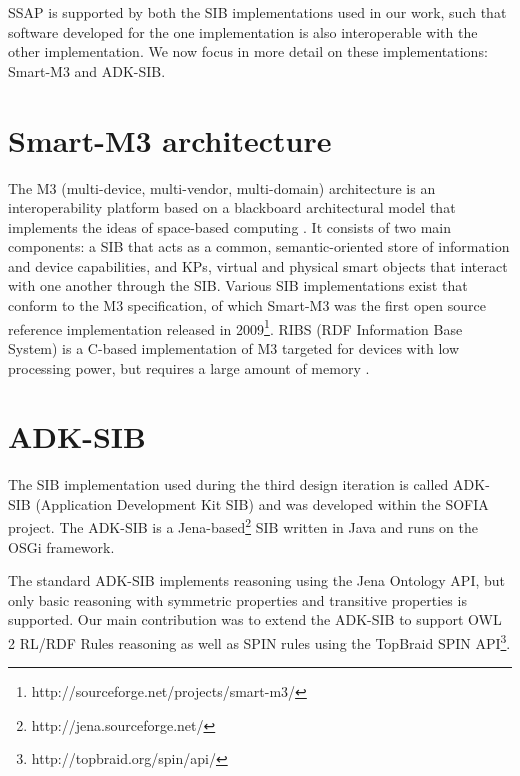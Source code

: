 \ac{SSAP} is supported by both the \ac{SIB} implementations used in our work, such that software developed for the one implementation is also interoperable with the other implementation. We now focus in more detail on these implementations: Smart-M3 and ADK-SIB.


\section{Smart-M3 architecture}
\label{m3}
The M3 (multi-device, multi-vendor, multi-domain) architecture is an interoperability platform based on a blackboard architectural model that implements the ideas of space-based computing \cite{Honkola2010}. It consists of two main components: a \ac{SIB} that acts as a common, semantic-oriented store of information and device capabilities, and \acp{KP}, virtual and physical smart objects that interact with one another through the \ac{SIB}. Various \ac{SIB} implementations exist that conform to the M3 specification, of which Smart-M3 was the first open source reference implementation released in 2009\footnote{http://sourceforge.net/projects/smart-m3/}. RIBS (RDF Information Base System) is a C-based implementation of M3 targeted for devices with low processing power, but requires a large amount of memory \cite{Etelapera2011}.  


\section{ADK-SIB}

The \ac{SIB} implementation used during the third design iteration is called ADK-SIB (Application Development Kit SIB) and was developed within the \ac{SOFIA} project. The ADK-SIB is a Jena-based\footnote{http://jena.sourceforge.net/} \ac{SIB} written in Java and runs on the \ac{OSGi} framework.

The standard ADK-SIB implements reasoning using the Jena Ontology API, but only basic reasoning with symmetric properties and transitive properties is supported. Our main contribution was to extend the ADK-SIB to support OWL 2 RL/RDF Rules reasoning as well as \ac{SPIN} rules using the TopBraid \ac{SPIN} API\footnote{http://topbraid.org/spin/api/}.

